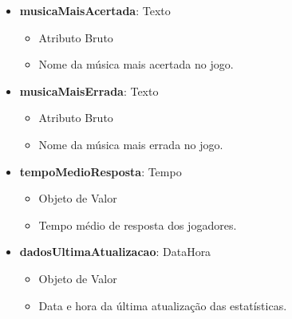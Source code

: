 \begin{itemize}
        \item \textbf{musicaMaisAcertada}: Texto  
              \begin{itemize}
                  \item Atributo Bruto
                  \item Nome da música mais acertada no jogo.
              \end{itemize}
    
        \item \textbf{musicaMaisErrada}: Texto  
              \begin{itemize}
                  \item Atributo Bruto
                  \item Nome da música mais errada no jogo.
              \end{itemize}
    
        \item \textbf{tempoMedioResposta}: Tempo  
              \begin{itemize}
                  \item Objeto de Valor
                  \item Tempo médio de resposta dos jogadores.
              \end{itemize}
    
        \item \textbf{dadosUltimaAtualizacao}: DataHora  
              \begin{itemize}
                  \item Objeto de Valor
                  \item Data e hora da última atualização das estatísticas.
              \end{itemize}
    \end{itemize}

